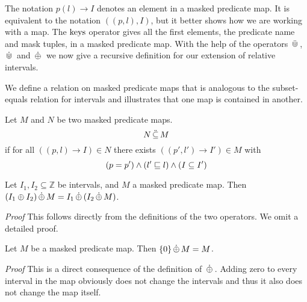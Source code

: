The notation $p(l) \rightarrow I$ denotes an element in a masked predicate map.
It is equivalent to the notation $((p,l), I)$, but it better shows how we are working with a map.
The $\operatorname{keys}$ operator gives all the first elements, the predicate name and mask tuples, in a masked predicate map.
With the help of the operators $\,\ddot{\Cup}\,$, $\,\dot{\Cup}\,$ and $\,\dot{\oplus}\,$ we now give a recursive definition for our extension of relative intervals.

We define a relation on masked predicate maps that is analogous to the subset-equals relation for intervals and illustrates that one map is contained in another.

\begin{definition}
    \label{def:subseteqmap}
    Let $M$ and $N$ be two masked predicate maps.
    \begin{equation*}
        N \,\ddot{\subseteq}\, M
    \end{equation*}
    if for all $((p,l) \to I) \in N$ there exists $((p',l') \to I') \in M$ with
    \begin{equation*}
        (p = p') \land (l' \sqsubseteq l) \land (I \subseteq I')
    \end{equation*}
\end{definition}

\begin{lemma}
    \label{lem:oplus-and-oplusext}
    Let $I_1, I_2 \subseteq \mathbb{Z}$ be intervals, and $M$ a masked predicate map.
    Then $(I_1 \oplus I_2) \,\dot{\oplus}\, M = I_1 \,\dot{\oplus}\, (I_2 \,\dot{\oplus}\, M)$.
\end{lemma}
\textit{Proof} This follows directly from the definitions of the two operators.
We omit a detailed proof.

\begin{lemma}
    \label{lem:oplusext-zero}
    Let $M$ be a masked predicate map.
    Then $\{0\} \,\dot{\oplus}\, M = M$.
\end{lemma}
\textit{Proof} This is a direct consequence of the definition of $\,\dot{\oplus}\,$.
Adding zero to every interval in the map obviously does not change the intervals and thus it also does not change the map itself.



